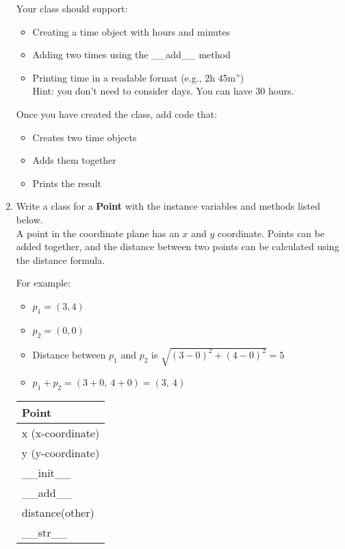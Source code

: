 \documentclass{article}
\newcommand{\csq}[1]{\reflectbox{''}#1''}  %
\begin{document}
\begin{enumerate}
		Your class should support:
		\begin{itemize}
			\item Creating a time object with hours and minutes
			\item Adding two times using the \_\_add\_\_ method 
			\item Printing time in a readable format (e.g., \csq{2h 45m})\\
				Hint: you don't need to consider days. You can have 30 hours.
		\end{itemize}

		Once you have created the class, add code that:
		\begin{itemize}
			\item Creates two time objects
			\item Adds them together
			\item Prints the result
		\end{itemize}



	\item
		Write a class for a \textbf{Point} with the instance variables and methods listed below.\\
		A point in the coordinate plane has an $x$ and $y$ coordinate. Points can be added together, 
		and the distance between two points can be calculated using the distance formula.
			
		\begin{minipage}[t]{0.65\textwidth}
			For example:
			\begin{itemize}
				\item $p_1 = (3, 4)$
				\item $p_2 = (0, 0)$
				\item Distance between $p_1$ and $p_2$ is $\sqrt{(3 - 0)^2 + (4 - 0)^2} = 5$
				\item $p_1 + p_2 = (3 + 0,\ 4 + 0) = (3,\ 4)$
			\end{itemize}
		\end{minipage}
		\hfill
		\begin{minipage}[t]{0.32\textwidth}
			\vspace{.2em}
			\begin{flushright}
				\begin{tabular}{|l|}
					\hline
					Point \\ \hline
					x (x-coordinate) \\
					y (y-coordinate) \\ \hline
					\_\_init\_\_ \\
					\_\_add\_\_ \\
					distance(other) \\
					\_\_str\_\_ \\ \hline
				\end{tabular}
			\end{flushright}
		\end{minipage}
		

\end{enumerate}
\end{document}
